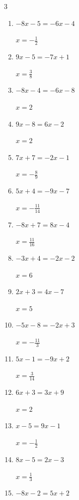 \begin{multicols}{3}
\begin{enumerate}
  \item $-8x-5=-6x-4$

        $\displaystyle x=-\frac{1}{2}$

  \item $9x-5=-7x+1$

        $\displaystyle x=\frac{3}{8}$

  \item $-8x-4=-6x-8$

        $\displaystyle x=2$

  \item $9x-8=6x-2$

        $\displaystyle x=2$

  \item $7x+7=-2x-1$

        $\displaystyle x=-\frac{8}{9}$

  \item $5x+4=-9x-7$

        $\displaystyle x=-\frac{11}{14}$

  \item $-8x+7=8x-4$

        $\displaystyle x=\frac{11}{16}$

  \item $-3x+4=-2x-2$

        $\displaystyle x=6$

  \item $2x+3=4x-7$

        $\displaystyle x=5$

  \item $-5x-8=-2x+3$

        $\displaystyle x=-\frac{11}{3}$

  \item $5x-1=-9x+2$

        $\displaystyle x=\frac{3}{14}$

  \item $6x+3=3x+9$

        $\displaystyle x=2$

  \item $x-5=9x-1$

        $\displaystyle x=-\frac{1}{2}$

\columnbreak %

  \item $8x-5=2x-3$

        $\displaystyle x=\frac{1}{3}$

  \item $-8x-2=5x+2$


\end{enumerate}
\end{multicols}
